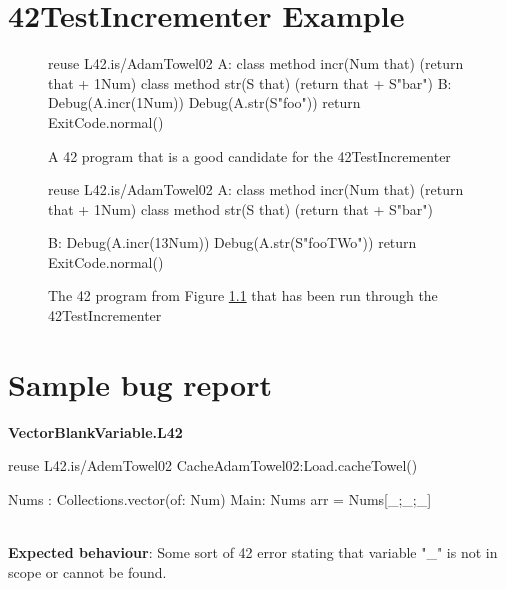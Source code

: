 \begin{appendices}

\chapter{42TestIncrementer Example \label{incrementerExample}}

\begin{figure}[h]
\begin{42listing}
reuse L42.is/AdamTowel02
A: {
	class method incr(Num that) (return that + 1Num)
	class method str(S that) (return that + S"bar")
}
B: {
	Debug(A.incr(1Num))
	Debug(A.str(S"foo"))
	return ExitCode.normal()
}
\end{42listing}
\caption{A 42 program that is a good candidate for the 42TestIncrementer \label{42incr}}
\end{figure}

\begin{figure}[h]
\begin{42listing}
reuse L42.is/AdamTowel02
A: {
	class method incr(Num that) (return that + 1Num)
	class method str(S that) (return that + S"bar")
}

B: {
	Debug(A.incr(13Num))
	Debug(A.str(S"fooTWo"))
	return ExitCode.normal()
}
\end{42listing}
\caption{The 42 program from Figure \ref{42incr} that has been run through the 42TestIncrementer \label{incered}}
\end{figure}


\chapter{Sample bug report}

\textbf{VectorBlankVariable.L42}

\begin{42listing}
	reuse L42.is/AdemTowel02
	CacheAdamTowel02:Load.cacheTowel()

	Nums : Collections.vector(of: Num)
	Main: {
		Nums arr = Nums[_;_;_]
	}
\end{42listing}

~\\
\textbf{Expected behaviour}: Some sort of 42 error stating that variable "\_" is not in scope or cannot be found.


\end{appendices}
